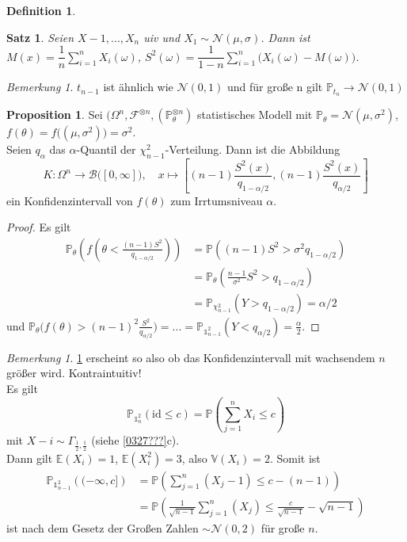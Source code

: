 \documentclass[10pt,a4paper]{article}
\newcommand{\al}{\ensuremath{\alpha}}
\newcommand{\cha}{\mathds{1}}
\newcommand{\Bor}{\mathscr B}
\newcommand{\Prb}{\mathbb P}
\newcommand{\Epv}{\ensuremath{\mathbb{E}}}
\newcommand{\Var}{\mathbb{V}}
\newcommand{\scF}{\ensuremath{\mathscr{F}}}
\newcommand{\Nv}{\mathscr N}
\theoremstyle{plain}
\newtheorem{satz}[theorem]{Satz}
\theoremstyle{definition}
\newtheorem{definition}[theorem]{Definition}
\newtheorem{prop}[theorem]{Proposition}
\theoremstyle{remark}
\newtheorem{bem}[theorem]{Bemerkung}
\newtheorem*{bem*}{Bemerkung}
\begin{document}
	\begin{definition}
	\end{definition}
	\addtocounter{theorem}{-1}
	\begin{satz}
		Seien $X-1,...,X_n$ uiv und $X_1\sim\Nv(\mu,\sigma)$. Dann ist $M(x)=\dfrac{1}{n}\sum_{i=1}^{n}X_i(\omega)$, $S^2(\omega)=\dfrac{1}{1-n}\sum_{i=1}^{n}\big(X_i(\omega)-M(\omega)\big)$.
	\end{satz}

	\begin{bem*}
		$t_{n-1}$ ist ähnlich wie $\Nv(0,1)$ und für große n gilt $\Prb_{t_n}\to\Nv(0,1)$
	\end{bem*}

	\begin{prop}\label{0628prop}
		Sei $\big(\Omega^n,\scF^{\otimes n},(\Prb_\theta^{\otimes n})$ statistisches Modell mit $\Prb_\theta=\Nv(\mu,\sigma^2)$, $f(\theta)=f\big((\mu,\sigma^2)\big)=\sigma^2$.\\
		Seien $q_\al$ das $\al$-Quantil der $\chi^2_{n-1}$-Verteilung. Dann ist die Abbildung 
		\[K:\Omega^n\to\Bor\big([0,\infty]\big),\quad x\mapsto\left[(n-1)\frac{S^2(x)}{q_{1-\al/2}},(n-1)\frac{S^2(x)}{q_{\al/2}}\right]\]
		ein Konfidenzintervall von $f(\theta)$ zum Irrtumsniveau $\al$.
	\end{prop}
	\begin{proof}
		Es gilt
		\begin{align*}
		\Prb_\theta\left(f(\theta<\frac{(n-1)S^2}{q_{1-\al/2}})\right)&=\Prb\left((n-1)S^2>\sigma^2q_{1-\al/2}\right)\\
		&=\Prb_\theta\left(\frac{n-1}{\sigma^2}S^2>q_{1-\al/2}\right)\\
		&=\Prb_{\chi^2_{n-1}}\left(Y>q_{1-\al/2}\right)=\al/2
		\end{align*}
		und $\Prb_\theta\big(f(\theta)>(n-1)^2\frac{S^2}{q_{\al/2}}\big)=...=\Prb_{\cha_{n-1}^2}(Y<q_{\al/2})=\frac{\al}{2}$.
	\end{proof}

	\begin{bem}
		\ref{0628prop} erscheint so also ob das Konfidenzintervall mit wachsendem $n$ größer wird. Kontraintuitiv!\\
		Es gilt
		\[\Prb_{\cha_n^2}(\mathrm{id}\leq c)=\Prb\left(\sum_{j=1}^{n}X_i\leq c\right)\]
		mit $X-i\sim\Gamma_{\frac{1}{2},\frac{1}{2}}$ (siehe \ref{0327???}c).\\
		Dann gilt $\Epv(X_i)=1$, $\Epv(X_i^2)=3$, also $\Var(X_i)=2$. Somit ist
		\begin{align*}
		\Prb_{\cha_{n-1}^2}\left((-\infty,c]\right)&=\Prb\left(\sum_{j=1}^{n}(X_j-1)\leq c-(n-1)\right)\\
		&=\Prb\left(\frac{1}{\sqrt{n-1}}\sum_{j=1}^{n}(X_j)\leq\frac{c}{\sqrt{n-1}}-\sqrt{n-1}\right)
		\end{align*}
		ist nach dem Gesetz der Großen Zahlen $\sim\Nv(0,2)$ für große $n$.
	\end{bem}
\end{document}
